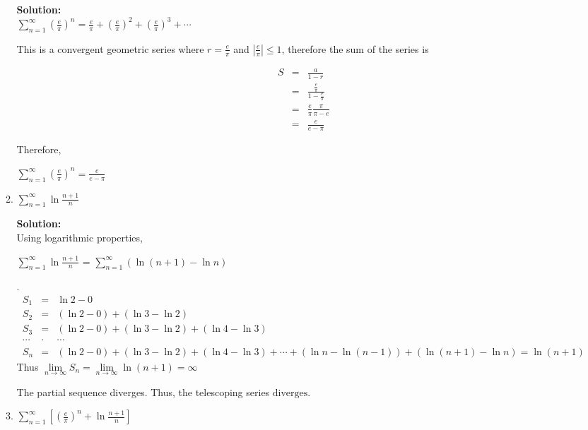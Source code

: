 \documentclass[paper=a4, fontsize=11pt]{scrartcl} %
\numberwithin{equation}{section} %
\numberwithin{figure}{section} %
\numberwithin{table}{section} %
\begin{document}
\begin{enumerate}
\begin{enumerate}
\noindent\textbf{Solution:}\\
$\sum\limits_{n=1}^\infty \left( \frac{e}{\pi} \right)^n=\frac{e}{\pi} + \left( \frac{e}{\pi} \right)^2 + \left( \frac{e}{\pi} \right)^3 + \cdots$

This is a convergent geometric series where $r=\frac{e}{\pi}$ and $|\frac{e}{\pi}| \le 1$, therefore the sum of the series is 

\begin{eqnarray*}
S &=& \frac{a}{1-r} \\
&=& \frac{\frac{e}{\pi}}{1-\frac{e}{\pi}} \\
&=& \frac{e}{\pi} \frac{\pi}{\pi-e} \\
&=& \frac{e}{e-\pi} 
\end{eqnarray*}

Therefore,  \begin{large}$ \boxed{\sum\limits_{n=1}^\infty \left( \frac{e}{\pi} \right)^n =  \frac{e}{e-\pi}} $\end{large}

\vspace{.5in}
\item \begin{large}$\sum\limits_{n=1}^\infty \ln \frac{n+1}{n}$\end{large}

\noindent\textbf{Solution:}\\
Using logarithmic properties, \begin{large}$\sum\limits_{n=1}^\infty \ln \frac{n+1}{n}$ = $\sum\limits_{n=1}^\infty \left( \ln (n+1)- \ln n \right)$\end{large}.
\begin{eqnarray*}
S_1 &=& \ln 2 - 0 \\
S_2 &=& (\ln 2 - 0) + (\ln 3 - \ln 2)\\
S_3 &=& (\ln 2 - 0) + (\ln 3 - \ln 2) + (\ln 4 - \ln 3)\\
\cdots &\cdot & \cdots \\
S_n &=& (\ln 2 - 0) + (\ln 3 - \ln 2) + (\ln 4 - \ln 3) + \cdots + (\ln n - \ln (n-1)) + (\ln (n+1) - \ln n) = \ln (n+1)
\end{eqnarray*}
Thus $\lim\limits_{n \rightarrow \infty} S_n = \lim\limits_{n \rightarrow \infty} \ln (n+1) = \infty $

The partial sequence diverges.  Thus, the telescoping series $\boxed{ \text{diverges}}$.
\newpage 


\item \begin{large}$\sum\limits_{n=1}^\infty \left[ \left( \frac{e}{\pi} \right)^n + \ln \frac{n+1}{n} \right]$\end{large}


\end{enumerate}
\end{enumerate}
\end{document}
